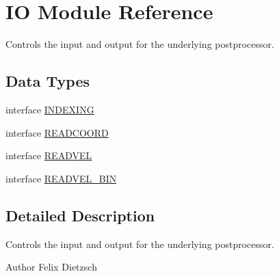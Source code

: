 \hypertarget{namespaceIO}{
\section{IO Module Reference}
\label{namespaceIO}
}


Controls the input and output for the underlying postprocessor.  


\subsection*{Data Types}
\begin{DoxyCompactItemize}
\item 
interface \hyperlink{interfaceIO_1_1INDEXING}{INDEXING}
\item 
interface \hyperlink{interfaceIO_1_1READCOORD}{READCOORD}
\item 
interface \hyperlink{interfaceIO_1_1READVEL}{READVEL}
\item 
interface \hyperlink{interfaceIO_1_1READVEL__BIN}{READVEL\_\-BIN}
\end{DoxyCompactItemize}


\subsection{Detailed Description}
Controls the input and output for the underlying postprocessor. \begin{DoxyAuthor}{Author}
Felix Dietzsch 
\end{DoxyAuthor}
